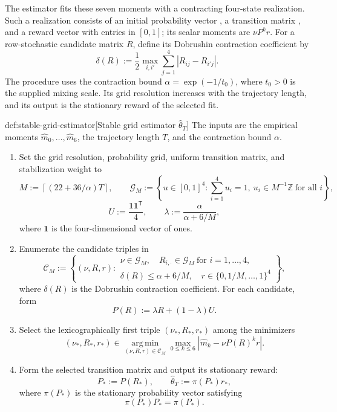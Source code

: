 \documentclass[11pt]{article}
\begin{document}
The estimator fits these seven moments with a contracting four-state realization. Such a realization consists of an initial probability vector , a transition matrix , and a reward vector  with entries in \([0,1]\); its scalar moments are \(\nu P^k r\). For a row-stochastic candidate matrix \(R\), define its Dobrushin contraction coefficient by
\[
\delta(R):=\frac12\max_{i,i'}\sum_{j=1}^{4}|R_{ij}-R_{i'j}|.
\]
The procedure uses the contraction bound \(\alpha=\exp(-1/t_0)\), where \(t_0>0\) is the supplied mixing scale. Its grid resolution  increases with the trajectory length, and its output  is the stationary reward of the selected fit.

\begin{algorithmv}{def:stable-grid-estimator}[Stable grid estimator $\widehat\theta_T$]
The inputs are the empirical moments \(\widehat m_0,\ldots,\widehat m_6\), the trajectory length \(T\), and the contraction bound \(\alpha\).
\begin{enumerate}
\item Set the grid resolution, probability grid, uniform transition matrix, and stabilization weight to
\[
M:=\left\lceil(22+36/\alpha)T\right\rceil,
\qquad
\mathcal G_M
:=
\left\{
u\in[0,1]^4:
\sum_{i=1}^{4}u_i=1,\ 
u_i\in M^{-1}\mathbb Z\ \text{for all }i
\right\},
\]
\[
U:=\frac{\mathbf1\mathbf1^{\mathsf T}}{4},
\qquad
\lambda:=\frac{\alpha}{\alpha+6/M},
\]
where \(\mathbf1\) is the four-dimensional vector of ones.
\item Enumerate the candidate triples in
\[
\mathcal C_M
:=
\left\{
(\nu,R,r):
\begin{gathered}
\nu\in\mathcal G_M,\quad
R_{i,\cdot}\in\mathcal G_M\ \text{for }i=1,\ldots,4,\\
\delta(R)\le\alpha+6/M,\quad
r\in\{0,1/M,\ldots,1\}^{4}
\end{gathered}
\right\},
\]
where \(\delta(R)\) is the Dobrushin contraction coefficient. For each candidate, form
\[
P(R):=\lambda R+(1-\lambda)U.
\]
\item Select the lexicographically first triple \((\nu_*,R_*,r_*)\) among the minimizers
\[
(\nu_*,R_*,r_*)
\in
\operatorname*{arg\,min}_{(\nu,R,r)\in\mathcal C_M}
\max_{0\le k\le6}
\left|\widehat m_k-\nu P(R)^k r\right|.
\]
\item Form the selected transition matrix and output its stationary reward:
\[
P_*:=P(R_*),
\qquad
\widehat\theta_T:=\pi(P_*)r_*,
\]
where \(\pi(P_*)\) is the stationary probability vector satisfying
\[
\pi(P_*)P_*=\pi(P_*).
\]
\end{enumerate}
\end{algorithmv}
\end{document}
